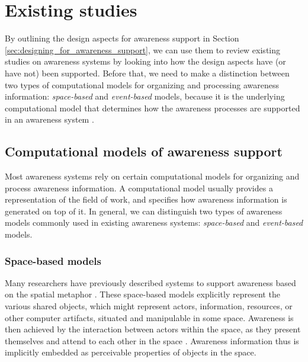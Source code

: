 \section{Existing studies} %
\label{sec:the_state_of_art}
By outlining the design aspects for awareness support in Section \ref{sec:designing_for_awareness_support}, we can use them to review existing studies on awareness systems by looking into how the design aspects have (or have not) been supported. Before that, we need to make a distinction between two types of computational models for organizing and processing awareness information: \emph{space-based} and \emph{event-based} models, because it is the underlying computational model that determines how the awareness processes are supported in an awareness system \cite{Gross2004}.

\subsection{Computational models of awareness support} %
\label{sub:awareness_models}
Most awareness systems rely on certain computational models for organizing and process awareness information. A computational model usually provides a representation of the field of work, and specifies how awareness information is generated on top of it. In general, we can distinguish two types of awareness models commonly used in existing awareness systems: \emph{space-based} and \emph{event-based} models. 

\subsubsection{Space-based models} %
\label{ssub:space_based_model}
Many researchers have previously described systems to support awareness based on the spatial metaphor \cite{Benford1993,Rodden1996,Sandor1997,simone2002a}. These space-based models explicitly represent the various shared objects, which might represent actors, information, resources, or other computer artifacts, situated and manipulable in some space. Awareness is then achieved by the interaction between actors within the space, as they present themselves and attend to each other in the space \cite{Rodden1996}. Awareness information thus is implicitly embedded as perceivable properties of objects in the space.  

